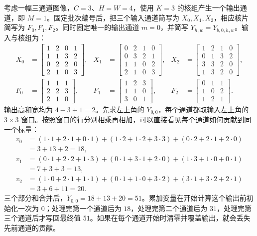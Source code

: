 考虑一幅三通道图像，$C=3$、$H=W=4$，使用 $K=3$ 的核组产生一个输出通道，即 $M=1$。固定批次编号后，把三个输入通道简写为 $X_0,X_1,X_2$，相应核片简写为 $F_0,F_1,F_2$。同时固定唯一的输出通道 $m=0$，并简写 $Y_{h,w}=Y_{b,0,h,w}$。输入与核组为：
\begin{equation}
\begin{aligned}
X_0&=\begin{bmatrix}1&2&0&1\\1&1&3&2\\0&2&2&0\\2&1&0&3\end{bmatrix},&
X_1&=\begin{bmatrix}0&2&1&0\\0&3&2&1\\1&1&0&2\\2&1&0&3\end{bmatrix},&
X_2&=\begin{bmatrix}1&2&1&0\\0&1&3&2\\3&3&2&0\\1&3&2&0\end{bmatrix},\\[.6em]
F_0&=\begin{bmatrix}1&1&1\\2&2&3\\2&1&0\end{bmatrix},&
F_1&=\begin{bmatrix}1&2&3\\1&1&0\\3&0&1\end{bmatrix},&
F_2&=\begin{bmatrix}0&1&1\\1&0&2\\1&2&1\end{bmatrix}.
\end{aligned}
\label{l11:eq:channel_example_inputs}
\end{equation}
输出高和宽均为 $4-3+1=2$。先求左上角的 $Y_{0,0}$，每个通道都取输入左上角的 $3\times3$ 窗口。按照窗口的行分别相乘再相加，可以直接看见每个通道如何贡献到同一个标量：
\begin{equation}
\begin{aligned}
v_0
&=(1\cdot1+2\cdot1+0\cdot1)
 +(1\cdot2+1\cdot2+3\cdot3)
 +(0\cdot2+2\cdot1+2\cdot0)\\
&=3+13+2=18,\\[.25em]
v_1
&=(0\cdot1+2\cdot2+1\cdot3)
 +(0\cdot1+3\cdot1+2\cdot0)
 +(1\cdot3+1\cdot0+0\cdot1)\\
&=7+3+3=13,\\[.25em]
v_2
&=(1\cdot0+2\cdot1+1\cdot1)
 +(0\cdot1+1\cdot0+3\cdot2)
 +(3\cdot1+3\cdot2+2\cdot1)\\
&=3+6+11=20.
\end{aligned}
\label{l11:eq:channel_contributions}
\end{equation}
三个部分和合并后，$Y_{0,0}=18+13+20=51$。累加变量在开始计算这个输出前初始化一次为 $0$；处理完第一个通道后为 $18$，处理完第二个通道后为 $31$，处理完第三个通道后才写回最终值 $51$。如果在每个通道开始时清零并覆盖输出，就会丢失先前通道的贡献。

